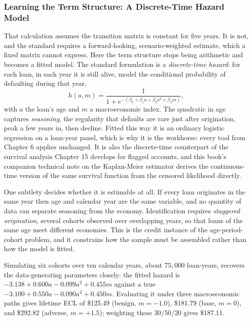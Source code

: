 \documentclass[../ai_in_finance]{subfiles}
\begin{document}
\subsubsection*{Learning the Term Structure: A Discrete-Time Hazard Model}
\label{sec:hazard-term-structure}

That calculation assumes the transition matrix is constant for five years. It is not, and the standard requires a forward-looking, scenario-weighted estimate, which a fixed matrix cannot express. Here the term structure stops being arithmetic and becomes a fitted model. The standard formulation is a \emph{discrete-time hazard}: for each loan, in each year it is still alive, model the conditional probability of defaulting during that year,
\begin{equation*}
h(a,m) = \frac{1}{1+e^{-(\beta_0+\beta_1 a+\beta_2 a^2+\beta_3 m)}},
\end{equation*}
with $a$ the loan's age and $m$ a macroeconomic index. The quadratic in age captures \emph{seasoning}, the regularity that defaults are rare just after origination, peak a few years in, then decline. Fitted this way it is an ordinary logistic regression on a loan-year panel, which is why it is the workhorse: every tool from Chapter 6 applies unchanged. It is also the discrete-time counterpart of the survival analysis Chapter 15 develops for flagged accounts, and this book's companion technical note on the Kaplan-Meier estimator derives the continuous-time version of the same survival function from the censored likelihood directly.

One subtlety decides whether it is estimable at all. If every loan originates in the same year then age and calendar year are the same variable, and no quantity of data can separate seasoning from the economy. Identification requires \emph{staggered origination}, several cohorts observed over overlapping years, so that loans of the same age meet different economies. This is the credit instance of the age-period-cohort problem, and it constrains how the sample must be assembled rather than how the model is fitted.

Simulating six cohorts over ten calendar years, about $75{,}000$ loan-years, recovers the data-generating parameters closely: the fitted hazard is $-3.138+0.600a-0.099a^2+0.455m$ against a true $-3.100+0.550a-0.090a^2+0.450m$. Evaluating it under three macroeconomic paths gives lifetime ECL of \$125.49 (benign, $m=-1.0$), \$181.79 (base, $m=0$), and \$292.82 (adverse, $m=+1.5$); weighting these $30/50/20$ gives \$187.11.
\end{document}
